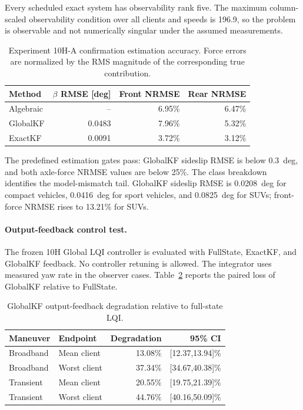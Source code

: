 Every scheduled exact system has observability rank five. The maximum
column-scaled observability condition over all clients and speeds is 196.9,
so the problem is observable and not numerically singular under the assumed
measurements.

\begin{table}[htbp]
\centering
\caption{Experiment 10H-A confirmation estimation accuracy. Force errors are
normalized by the RMS magnitude of the corresponding true contribution.}
\label{tab:experiment10ha-estimation}
\begin{tabular}{lrrr}
\toprule
Method & $\beta$ RMSE [deg] & Front NRMSE & Rear NRMSE\\
\midrule
Algebraic & --     & 6.95\% & 6.47\%\\
GlobalKF  & 0.0483 & 7.96\% & 5.32\%\\
ExactKF   & 0.0091 & 3.72\% & 3.12\%\\
\bottomrule
\end{tabular}
\end{table}

The predefined estimation gates pass: GlobalKF sideslip RMSE is below
0.3~deg, and both axle-force NRMSE values are below 25\%. The class breakdown
identifies the model-mismatch tail. GlobalKF sideslip RMSE is 0.0208~deg for
compact vehicles, 0.0416~deg for sport vehicles, and 0.0825~deg for SUVs;
front-force NRMSE rises to 13.21\% for SUVs.

\paragraph{Output-feedback control test.}
The frozen 10H Global LQI controller is evaluated with FullState, ExactKF, and
GlobalKF feedback. No controller retuning is allowed. The integrator uses
measured yaw rate in the observer cases. Table~\ref{tab:experiment10ha-control}
reports the paired loss of GlobalKF relative to FullState.

\begin{table}[htbp]
\centering
\caption{GlobalKF output-feedback degradation relative to full-state LQI.}
\label{tab:experiment10ha-control}
\begin{tabular}{llrr}
\toprule
Maneuver & Endpoint & Degradation & 95\% CI\\
\midrule
Broadband & Mean client  & 13.08\% & [12.37,13.94]\%\\
Broadband & Worst client & 37.34\% & [34.67,40.38]\%\\
Transient & Mean client  & 20.55\% & [19.75,21.39]\%\\
Transient & Worst client & 44.76\% & [40.16,50.09]\%\\
\bottomrule
\end{tabular}
\end{table}

